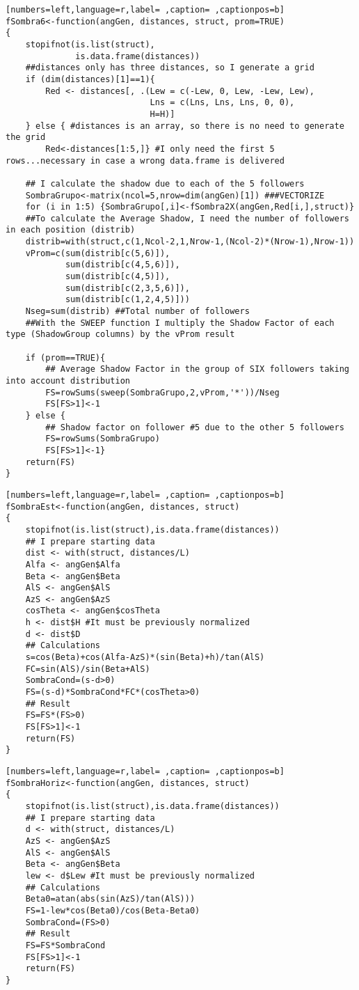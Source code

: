 \begin{lstlisting}[numbers=left,language=r,label= ,caption= ,captionpos=b]
fSombra6<-function(angGen, distances, struct, prom=TRUE)
{
    stopifnot(is.list(struct),
              is.data.frame(distances))
    ##distances only has three distances, so I generate a grid
    if (dim(distances)[1]==1){ 
        Red <- distances[, .(Lew = c(-Lew, 0, Lew, -Lew, Lew),
                             Lns = c(Lns, Lns, Lns, 0, 0),
                             H=H)]
    } else { #distances is an array, so there is no need to generate the grid
        Red<-distances[1:5,]} #I only need the first 5 rows...necessary in case a wrong data.frame is delivered

    ## I calculate the shadow due to each of the 5 followers
    SombraGrupo<-matrix(ncol=5,nrow=dim(angGen)[1]) ###VECTORIZE
    for (i in 1:5) {SombraGrupo[,i]<-fSombra2X(angGen,Red[i,],struct)}
    ##To calculate the Average Shadow, I need the number of followers in each position (distrib)
    distrib=with(struct,c(1,Ncol-2,1,Nrow-1,(Ncol-2)*(Nrow-1),Nrow-1)) 
    vProm=c(sum(distrib[c(5,6)]),
            sum(distrib[c(4,5,6)]),
            sum(distrib[c(4,5)]),
            sum(distrib[c(2,3,5,6)]),
            sum(distrib[c(1,2,4,5)]))
    Nseg=sum(distrib) ##Total number of followers
    ##With the SWEEP function I multiply the Shadow Factor of each type (ShadowGroup columns) by the vProm result

    if (prom==TRUE){
        ## Average Shadow Factor in the group of SIX followers taking into account distribution
        FS=rowSums(sweep(SombraGrupo,2,vProm,'*'))/Nseg
        FS[FS>1]<-1
    } else {		
        ## Shadow factor on follower #5 due to the other 5 followers
        FS=rowSums(SombraGrupo)
        FS[FS>1]<-1}
    return(FS)
}
\end{lstlisting}
\begin{lstlisting}[numbers=left,language=r,label= ,caption= ,captionpos=b]
fSombraEst<-function(angGen, distances, struct)
{
    stopifnot(is.list(struct),is.data.frame(distances))
    ## I prepare starting data
    dist <- with(struct, distances/L)
    Alfa <- angGen$Alfa
    Beta <- angGen$Beta
    AlS <- angGen$AlS
    AzS <- angGen$AzS
    cosTheta <- angGen$cosTheta
    h <- dist$H #It must be previously normalized
    d <- dist$D                   
    ## Calculations
    s=cos(Beta)+cos(Alfa-AzS)*(sin(Beta)+h)/tan(AlS)
    FC=sin(AlS)/sin(Beta+AlS)
    SombraCond=(s-d>0)
    FS=(s-d)*SombraCond*FC*(cosTheta>0)
    ## Result
    FS=FS*(FS>0)
    FS[FS>1]<-1
    return(FS)
}
\end{lstlisting}
\begin{lstlisting}[numbers=left,language=r,label= ,caption= ,captionpos=b]
fSombraHoriz<-function(angGen, distances, struct)
{
    stopifnot(is.list(struct),is.data.frame(distances))
    ## I prepare starting data 	
    d <- with(struct, distances/L)
    AzS <- angGen$AzS
    AlS <- angGen$AlS
    Beta <- angGen$Beta
    lew <- d$Lew #It must be previously normalized
    ## Calculations
    Beta0=atan(abs(sin(AzS)/tan(AlS)))
    FS=1-lew*cos(Beta0)/cos(Beta-Beta0)
    SombraCond=(FS>0)
    ## Result
    FS=FS*SombraCond
    FS[FS>1]<-1
    return(FS)
}
\end{lstlisting}
